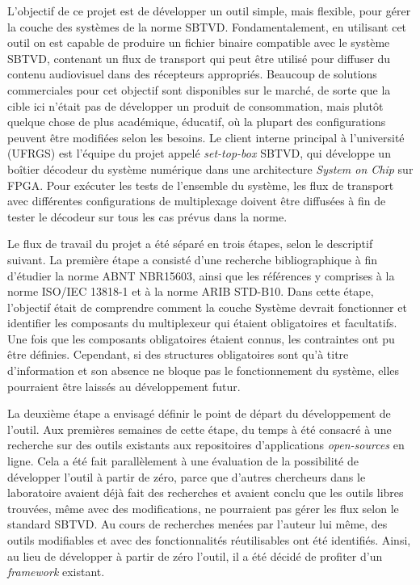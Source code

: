 \documentclass[12pt,a4paper]{article}
\begin{document}
L'objectif de ce projet est de développer un outil simple, mais flexible, pour gérer la couche des systèmes de la norme SBTVD. Fondamentalement, en utilisant cet outil on est capable de produire un fichier binaire compatible avec le système SBTVD, contenant un flux de transport qui peut être utilisé pour diffuser du contenu audiovisuel  dans des récepteurs appropriés. Beaucoup de solutions commerciales pour cet objectif sont disponibles sur le marché, de sorte que la cible ici n'était pas de développer un produit de consommation, mais plutôt quelque chose de plus académique, éducatif, où la plupart des configurations peuvent être modifiées selon les besoins. Le client interne principal à l'université (UFRGS) est l'équipe du projet appelé \textit{set-top-box} SBTVD, qui développe un boîtier décodeur du système numérique dans une architecture \textit{System on Chip} sur FPGA. Pour exécuter les tests de l'ensemble du système, les flux de transport avec différentes configurations de multiplexage doivent être diffusées à fin de tester le décodeur sur tous les cas prévus dans la norme.

Le flux de travail du projet a été séparé en trois étapes, selon le descriptif suivant. La première étape a consisté d'une recherche bibliographique à fin d'étudier la norme ABNT NBR15603, ainsi que les références y comprises à la norme ISO/IEC 13818-1 et à la norme ARIB STD-B10. Dans cette étape, l'objectif était de comprendre comment la couche Système devrait fonctionner et identifier les composants du multiplexeur qui étaient obligatoires et facultatifs. Une fois que les composants obligatoires étaient connus, les contraintes ont pu être définies. Cependant, si des structures obligatoires sont qu'à titre d'information et son absence ne bloque pas le fonctionnement du système, elles pourraient être laissés au développement futur.

La deuxième étape a envisagé définir le point de départ du développement de l'outil. Aux premières semaines de cette étape, du temps à été consacré à une recherche sur des outils existants aux repositoires d'applications \textit{open-sources} en ligne. Cela a été fait parallèlement à une évaluation de la possibilité de développer l'outil à partir de zéro, parce que d'autres chercheurs dans le laboratoire avaient déjà fait des recherches et avaient conclu que les outils libres trouvées, même avec des modifications, ne pourraient pas gérer les flux selon le standard SBTVD. Au cours de recherches menées par l'auteur lui même, des outils modifiables et avec des fonctionnalités réutilisables ont été identifiés. Ainsi, au lieu de développer à partir de zéro l'outil, il a été décidé de profiter d'un \textit{framework} existant.
\end{document}
